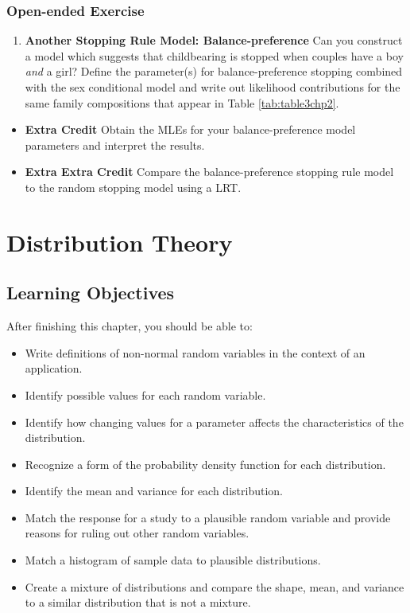 \documentclass[
]{krantz}
\providecommand{\tightlist}{%
  \setlength{\itemsep}{0pt}\setlength{\parskip}{0pt}}
\begin{document}
\hypertarget{open-ended-exercise}{%
\subsection{Open-ended Exercise}\label{open-ended-exercise}}

\begin{enumerate}
\def\labelenumi{\arabic{enumi}.}
\tightlist
\item
  \textbf{Another Stopping Rule Model: Balance-preference}
  Can you construct a model which suggests that childbearing is stopped when couples have a boy \emph{and} a girl? Define the parameter(s) for balance-preference stopping combined with the sex conditional model and write out likelihood contributions for the same family compositions that appear in Table \ref{tab:table3chp2}.
\end{enumerate}

\begin{itemize}
\item
  \textbf{Extra Credit} Obtain the MLEs for your balance-preference model parameters and interpret the results.
\item
  \textbf{Extra Extra Credit} Compare the balance-preference stopping rule model to the random stopping model using a LRT.
\end{itemize}

\hypertarget{ch-distthry}{%
\chapter{Distribution Theory}\label{ch-distthry}}

\hypertarget{learning-objectives-2}{%
\section{Learning Objectives}\label{learning-objectives-2}}

After finishing this chapter, you should be able to:

\begin{itemize}
\tightlist
\item
  Write definitions of non-normal random variables in the context of an application.
\item
  Identify possible values for each random variable.
\item
  Identify how changing values for a parameter affects the characteristics of the distribution.
\item
  Recognize a form of the probability density function for each distribution.
\item
  Identify the mean and variance for each distribution.
\item
  Match the response for a study to a plausible random variable and provide reasons for ruling out other random variables.
\item
  Match a histogram of sample data to plausible distributions.
\item
  Create a mixture of distributions and compare the shape, mean, and variance to a similar distribution that is not a mixture.
\end{itemize}
\end{document}
